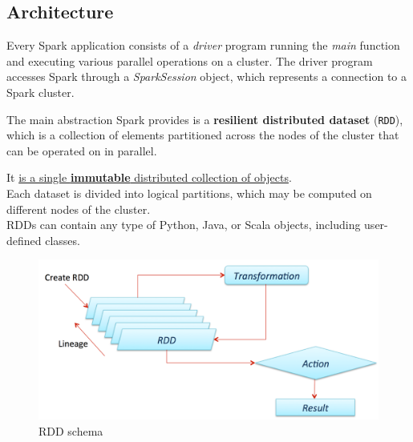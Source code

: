 
\subsection{Architecture}
Every Spark application consists of a \textit{driver} program running the \textit{main} function and executing various parallel operations on a cluster. The driver program accesses Spark through a \textit{SparkSession} object, which represents a connection to a Spark cluster.

\begin{paracol}{2}
   The main abstraction Spark provides is a \textbf{resilient distributed dataset} (\texttt{RDD}), which is a collection of elements partitioned across the nodes of the cluster that can be operated on in parallel.
   \begin{definition}
      [RDD]
      It \ul{is a single \textbf{immutable} distributed collection of objects}.\\
      Each dataset is divided into logical partitions, which may be computed on different nodes of the cluster.\\
      RDDs can contain any type of Python, Java, or Scala objects, including user-defined classes.
   \end{definition}
   
   \switchcolumn

   \begin{figure}[htbp]
      \centering
      \includegraphics[width=0.9\columnwidth]{images/14/spark_rdd.png}
      \caption{RDD schema}
      \label{fig:14/spark_rdd}
   \end{figure}

\end{paracol}


